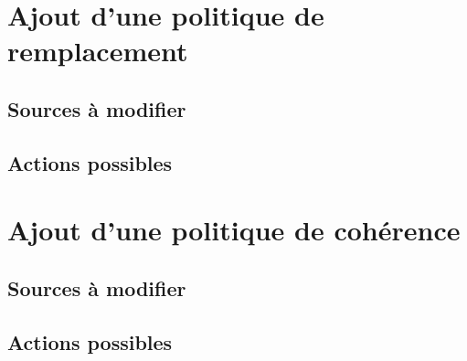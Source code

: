 \section{Ajout d'une politique de remplacement}

\subsection{Sources à modifier}

\subsection{Actions possibles}

\section{Ajout d'une politique de cohérence}

\subsection{Sources à modifier}

\subsection{Actions possibles}
